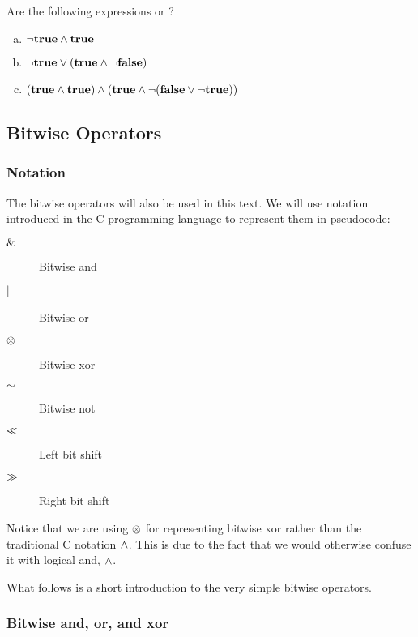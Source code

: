 \begin{Exercise}[label={boolean}]
  Are the following expressions \True or \False?

  \begin{enumerate}[(a)]
  \item $\neg \textbf{true} \wedge \textbf{true}$
  \item $\neg \textbf{true} \vee (\textbf{true} \wedge \neg \textbf{false})$

  \item $(\textbf{true} \wedge \textbf{true}) \wedge (\textbf{true} \wedge \neg(\textbf{false} \vee \neg \textbf{true}))$

  \end{enumerate}
\end{Exercise}

\subsection{Bitwise Operators}
\label{sec:bitwise-operators}

\subsubsection{Notation}

The bitwise operators will also be used in this text. We will use
notation introduced in the C programming language\cite{kernighan1988c}
to represent them in pseudocode:

\begin{description}
\item[$\mathrel{\&}$] Bitwise and
\item[$\mathrel{|}$] Bitwise or
\item[$\mathrel{\otimes}$] Bitwise xor
\item[$\mathord{\sim}$] Bitwise not
\item[$\ll$] Left bit shift
\item[$\gg$] Right bit shift
\end{description}

Notice that we are using $\mathrel{\otimes}$ for representing bitwise
xor rather than the traditional C notation $\wedge$. This is due to
the fact that we would otherwise confuse it with logical and, $\wedge$.

What follows is a short introduction to the very simple bitwise
operators.

\subsubsection{Bitwise and, or, and xor}

